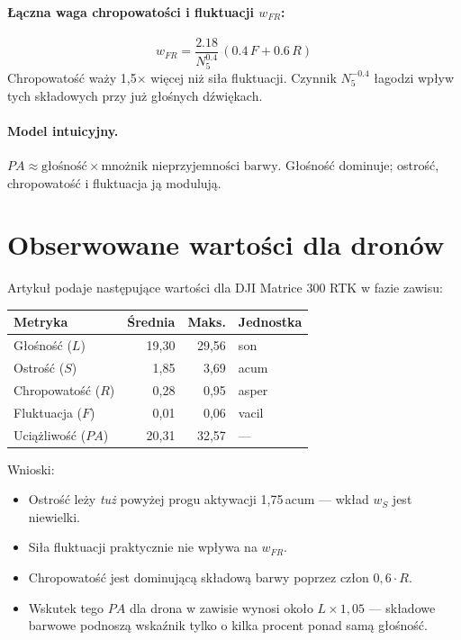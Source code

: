 \documentclass[11pt,a4paper]{article}
\begin{document}
\paragraph{Łączna waga chropowatości i fluktuacji \boldmath$w_{FR}$:}
\[
  w_{FR} = \frac{2.18}{N_5^{0.4}}\,(0.4\,F + 0.6\,R)
\]
Chropowatość waży 1{,}5$\times$ więcej niż siła fluktuacji. Czynnik
$N_5^{-0.4}$ łagodzi wpływ tych składowych przy już głośnych dźwiękach.

\paragraph{Model intuicyjny.}
$PA \approx \text{głośność} \times \text{mnożnik nieprzyjemności barwy}$.
Głośność dominuje; ostrość, chropowatość i fluktuacja ją modulują.

\section{Obserwowane wartości dla dronów}

Artykuł podaje następujące wartości dla DJI Matrice 300 RTK w fazie zawisu:

\begin{center}
\begin{tabular}{lrrl}
  \toprule
  Metryka & Średnia & Maks. & Jednostka \\
  \midrule
  Głośność ($L$)         & 19{,}30 & 29{,}56 & son    \\
  Ostrość ($S$)          & 1{,}85  & 3{,}69  & acum   \\
  Chropowatość ($R$)     & 0{,}28  & 0{,}95  & asper  \\
  Fluktuacja ($F$)       & 0{,}01  & 0{,}06  & vacil  \\
  Uciążliwość ($PA$)     & 20{,}31 & 32{,}57 & ---    \\
  \bottomrule
\end{tabular}
\end{center}

\noindent
Wnioski:
\begin{itemize}
  \item Ostrość leży \emph{tuż} powyżej progu aktywacji 1{,}75\,acum ---
        wkład $w_S$ jest niewielki.
  \item Siła fluktuacji praktycznie nie wpływa na $w_{FR}$.
  \item Chropowatość jest dominującą składową barwy poprzez człon
        $0{,}6 \cdot R$.
  \item Wskutek tego $PA$ dla drona w zawisie wynosi około $L \times 1{,}05$
        --- składowe barwowe podnoszą wskaźnik tylko o kilka procent ponad
        samą głośność.
\end{itemize}
\end{document}
